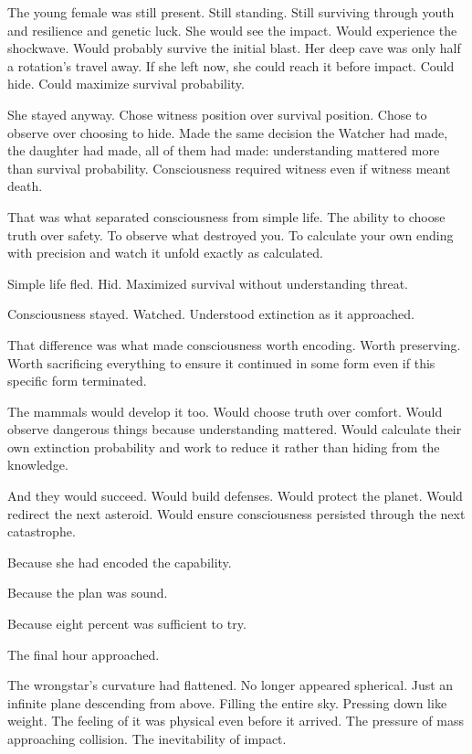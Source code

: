 The young female was still present. Still standing. Still surviving through youth and resilience and genetic luck. She would see the impact. Would experience the shockwave. Would probably survive the initial blast. Her deep cave was only half a rotation's travel away. If she left now, she could reach it before impact. Could hide. Could maximize survival probability.

She stayed anyway. Chose witness position over survival position. Chose to observe over choosing to hide. Made the same decision the Watcher had made, the daughter had made, all of them had made: understanding mattered more than survival probability. Consciousness required witness even if witness meant death.

That was what separated consciousness from simple life. The ability to choose truth over safety. To observe what destroyed you. To calculate your own ending with precision and watch it unfold exactly as calculated.

Simple life fled. Hid. Maximized survival without understanding threat.

Consciousness stayed. Watched. Understood extinction as it approached.

That difference was what made consciousness worth encoding. Worth preserving. Worth sacrificing everything to ensure it continued in some form even if this specific form terminated.

The mammals would develop it too. Would choose truth over comfort. Would observe dangerous things because understanding mattered. Would calculate their own extinction probability and work to reduce it rather than hiding from the knowledge.

And they would succeed. Would build defenses. Would protect the planet. Would redirect the next asteroid. Would ensure consciousness persisted through the next catastrophe.

Because she had encoded the capability.

Because the plan was sound.

Because eight percent was sufficient to try.

\scenebreak

The final hour approached.

The wrongstar's curvature had flattened. No longer appeared spherical. Just an infinite plane descending from above. Filling the entire sky. Pressing down like weight. The feeling of it was physical even before it arrived. The pressure of mass approaching collision. The inevitability of impact.

